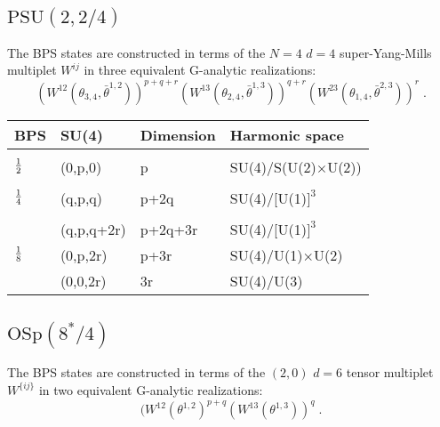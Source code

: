 \documentclass[a4paper,12pt]{article}
\begin{document}
\subsection{$\mbox{PSU}(2,2/4)$}

The BPS states are constructed in terms of the $N=4$ $d=4$ 
super-Yang-Mills multiplet $W^{ij}$ in three equivalent G-analytic 
realizations: 
\begin{equation}\label{8.01}
  (W^{12}(\theta_{3,4},\bar\theta^{1,2}))^{p+q+r}
(W^{13}(\theta_{2,4},\bar\theta^{1,3}))^{q+r} 
(W^{23}(\theta_{1,4},\bar\theta^{2,3}))^{r} \;.
\end{equation}

\begin{table}[h]
  \begin{center}
    \leavevmode
\label{bps4} 
    \begin{tabular}{llll}
 BPS & SU(4)  & Dimension & Harmonic space \\ \hline
  \\
 ${1\over 2}$ & (0,p,0) & p & SU(4)/S(U(2)$\times$U(2)) \\
  \\
 ${1\over 4}$ & (q,p,q) & p+2q & SU(4)/[U(1)$]^3$ \\ 
  \\
              & (q,p,q+2r) & p+2q+3r & SU(4)/[U(1)$]^3$ \\ 
 ${1\over 8}$ & (0,p,2r) & p+3r & SU(4)/U(1)$\times$U(2) \\ 
              & (0,0,2r) & 3r & SU(4)/U(3) \\ 
    \end{tabular}
  \end{center}
\end{table}

\subsection{$\mbox{OSp}(8^*/4)$}

The BPS states are constructed in terms of the $(2,0)$ $d=6$ 
tensor multiplet $W^{\{ij\}}$ in two equivalent G-analytic 
realizations: 
\begin{equation}\label{8.02}
  (W^{12}(\theta^{1,2})^{p+q}
(W^{13}(\theta^{1,3}))^{q} \;. 
\end{equation}
\end{document}
